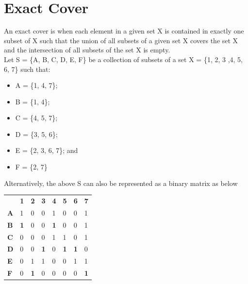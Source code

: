 \documentclass[a4paper,oneside,11pt]{report}
\newcounter{col}
\begin{document}
\section{Exact Cover}
An exact cover is when each element in a given set X is contained in exactly one subset of X such that  the union of all subsets of a given set X covers the set X and the intersection of all subsets of the set X is empty. \\
Let S = \{A, B, C, D, E, F\} be a collection of subsets of a set X = \{1, 2, 3 ,4, 5, 6, 7\} such that:
\begin{center}
\begin{minipage}{0.5\linewidth}
\begin{itemize}
\item A = \{1, 4, 7\};
\vspace{-0.5cm}
\item B = \{1, 4\};
\vspace{-0.5cm}
\item C = \{4, 5, 7\};
\vspace{-0.5cm}
\item D = \{3, 5, 6\};
\vspace{-0.5cm}
\item E = \{2, 3, 6, 7\}; and
\vspace{-0.5cm}
\item F = \{2, 7\}\\
\end{itemize}
\end{minipage}
\end{center}
\newpage
\noindent Alternatively, the above S can also be represented as a binary matrix as below\\
\begin{center}
\begin{tabular}{ m{0.5cm}  m{0.5cm} m{0.5cm} m{0.5cm} m{0.5cm} m{0.5cm} m{0.5cm} m{0.5cm}} 
& \textbf{1} & \textbf{2} & \textbf{3} & \textbf{4} & \textbf{5} & \textbf{6} & \textbf{7}\\ 
\textbf{A} & 1 & 0 & 0 & 1 & 0 & 0 & 1\\ 
\textbf{B} & \textbf{1} & 0 & 0 & \textbf{1} & 0 & 0 & 1\\ 
\textbf{C} & 0 & 0 & 0 & 1 & 1 & 0 & 1\\
\textbf{D} & 0 & 0 & \textbf{1} & 0 & \textbf{1} & \textbf{1} & 0\\
\textbf{E} & 0 & 1 & 1 & 0 & 0 & 1 & 1\\
\textbf{F} & 0 & \textbf{1} & 0 & 0 & 0 & 0 & \textbf{1}\\
\end{tabular}
\end{center}
\end{document}

